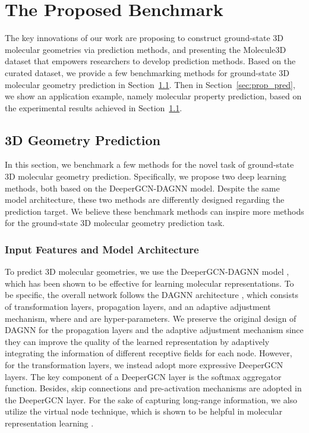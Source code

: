 \documentclass{article}
\begin{document}
\section{The Proposed Benchmark}
The key innovations of our work are proposing to construct ground-state 3D molecular geometries via prediction methods, and presenting the Molecule3D dataset that empowers researchers to develop prediction methods. Based on the curated dataset, we provide a few benchmarking methods for ground-state 3D molecular geometry prediction in Section~\ref{sec: geo_pred}. Then in Section~\ref{sec:prop_pred}, we show an application example, namely molecular property prediction, based on the experimental results achieved in Section~\ref{sec: geo_pred}.




\subsection{3D Geometry Prediction}
\label{sec: geo_pred}
In this section, we benchmark a few methods for the novel task of ground-state 3D molecular geometry prediction. Specifically, we propose two deep learning methods, both based on the DeeperGCN-DAGNN model. Despite the same model architecture, these two methods are differently designed regarding the prediction target. We believe these benchmark methods can inspire more methods for the ground-state 3D molecular geometry prediction task.

\subsubsection{Input Features and Model Architecture}
To predict 3D molecular geometries, we use the DeeperGCN-DAGNN model \cite{liu2021fast}, which has been shown to be effective for learning molecular representations. To be specific, the overall network follows the DAGNN architecture \cite{liu2020towards}, which consists of  transformation layers,  propagation layers, and an adaptive adjustment mechanism, where  and  are hyper-parameters. We preserve the original design of DAGNN for the propagation layers and the adaptive adjustment mechanism since they can improve the quality of the learned representation by adaptively integrating the information of different receptive fields for each node. However, for the transformation layers, we instead adopt more expressive DeeperGCN \cite{li2020deepergcn} layers. The key component of a DeeperGCN layer is the softmax aggregator function. Besides, skip connections \cite{he2016deep} and pre-activation \cite{he2016identity} mechanisms are adopted in the DeeperGCN layer. For the sake of capturing long-range information, we also utilize the virtual node technique, which is shown to be helpful in molecular representation learning \cite{gilmer2017neural,hu2021ogb}.
\end{document}
